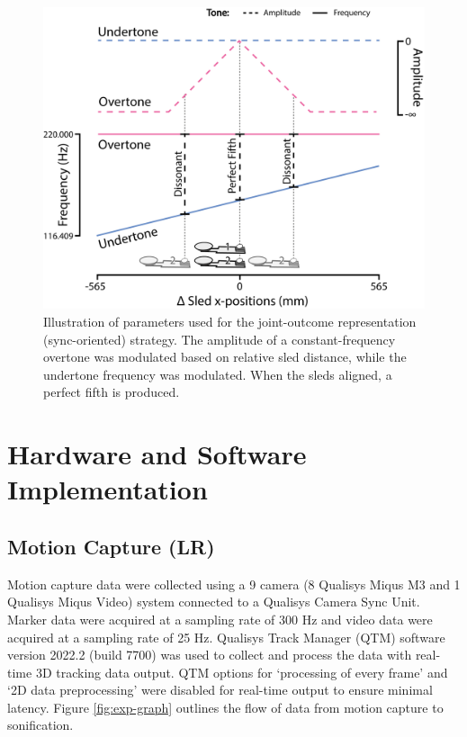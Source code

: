 \documentclass[10pt,a4paper,onecolumn]{article}
\begin{document}
\begin{figure}[h]

{\centering \includegraphics[width=1\linewidth]{figures/sync_sonif_illustration} 

}

\caption{Illustration of parameters used for the joint-outcome representation (sync-oriented) strategy. The amplitude of a constant-frequency overtone was modulated based on relative sled distance, while the undertone frequency was modulated. When the sleds aligned, a perfect fifth is produced.}\label{fig:sync-illustration}
\end{figure}

\hypertarget{hardware-and-software-implementation}{%
\section{Hardware and Software Implementation}\label{hardware-and-software-implementation}}

\hypertarget{motion-capture-lr}{%
\subsection{Motion Capture (LR)}\label{motion-capture-lr}}

Motion capture data were collected using a 9 camera (8 Qualisys Miqus M3 and 1 Qualisys Miqus Video) system connected to a Qualisys Camera Sync Unit. Marker data were acquired at a sampling rate of 300 Hz and video data were acquired at a sampling rate of 25 Hz. Qualisys Track Manager (QTM) software version 2022.2 (build 7700) was used to collect and process the data with real-time 3D tracking data output. QTM options for `processing of every frame' and `2D data preprocessing' were disabled for real-time output to ensure minimal latency. Figure \ref{fig:exp-graph} outlines the flow of data from motion capture to sonification.
\end{document}
